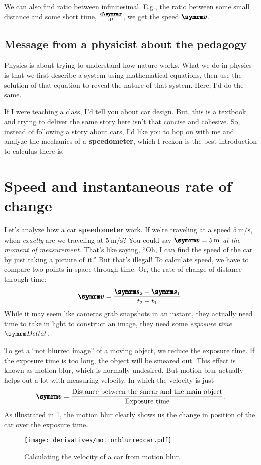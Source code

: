 We can also find ratio between infinitesimal. E.g., the ratio between some small distance and some short time, $\odv{\vv{x}}{t}$, we get the speed $\vv{v}$.

\subsection{Message from a physicist about the pedagogy}

Physics is about trying to understand how nature works. What we do in physics is that we first describe a system using mathematical equations, then use the solution of that equation to reveal the nature of that system. Here, I'd do the same.

If I were teaching a class, I'd tell you about car design. But, this is a textbook, and trying to deliver the same story here isn't that concise and cohesive. So, instead of following a story about cars, I'd like you to hop on with me and analyze the mechanics of a \textbf{speedometer}, which I reckon is the best introduction to calculus there is.

\section{Speed and instantaneous rate of change}
\label{sec:speedandinstantaneousrateofchange}

Let's analyze how a car \textbf{speedometer} work. If we're traveling at a speed $\qty{5}{\meter\per\second}$, when \emph{exactly} are we traveling at $\qty{5}{\meter\per\second}$? You could say $\vv{v} = \qty{5}{\meter}$ \emph{at the moment of measurement}. That's like saying, ``Oh, I can find the speed of the car by just taking a picture of it.'' But that's illegal! To calculate speed, we have to compare two points in space through time. Or, the rate of change of distance through time:
\begin{equation}
    \vv{v} = \frac{\vv{s}_2 - \vv{s}_1}{t_2 - t_1}. \label{eq:averagevelocity}
\end{equation}
While it may seem like cameras grab snapshots in an instant, they actually need time to take in light to construct an image, they need some \emph{exposure time} $\Dd{t}$.

To get a ``not blurred image'' of a moving object, we reduce the exposure time. If the exposure time is too long, the object will be smeared out. This effect is known as motion blur, which is normally undesired. But motion blur actually helps out a lot with measuring velocity. In which the velocity is just 
\begin{equation}
    \vv{v} = \frac{\textrm{Distance between the smear and the main object}}{\textrm{Exposure time}}.
\end{equation}
As illustrated in \cref{fig:car-motion-blur}, the motion blur clearly shows us the change in position of the car over the exposure time.
\begin{figure}[ht]
   \centering
   \texttt{[image: derivatives/motionblurredcar.pdf]} 
   \caption{Calculating the velocity of a car from motion blur.}
   \label{fig:car-motion-blur}
\end{figure}

